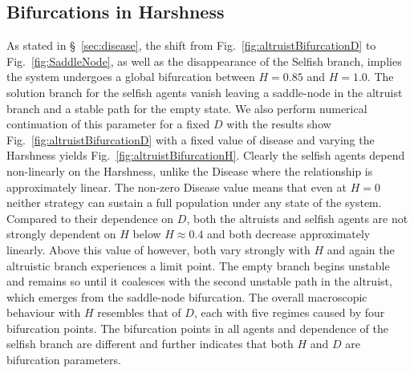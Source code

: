 \documentclass[11pt]{article}
\begin{document}
 

\subsection{Bifurcations in Harshness}
\label{sec:harshness}



As stated in \S~\ref{sec:disease}, the shift from Fig.~\ref{fig:altruistBifurcationD} to Fig.~\ref{fig:SaddleNode}, as well as the disappearance of the Selfish branch, implies the system undergoes a global bifurcation between $H=0.85$ and $H=1.0$. The solution branch for the selfish agents vanish leaving a saddle-node in the altruist branch and a stable path for the empty state. We also perform numerical continuation of this parameter for a fixed $D$ with the results show Fig.~\ref{fig:altruistBifurcationD} with a fixed value of disease and varying the Harshness yields Fig.~\ref{fig:altruistBifurcationH}. Clearly the selfish agents depend non-linearly on the Harshness, unlike the Disease where the relationship is approximately linear. The non-zero Disease value means that even at $H=0$ neither strategy can sustain a full population under any state of the system. Compared to their dependence on $D$, both the altruists and selfish agents are not strongly dependent on $H$ below $H\approx0.4$ and both decrease approximately linearly. Above this value of however, both vary strongly with $H$ and again the altruistic branch experiences a limit point. The empty branch begins unstable and remains so until it coalesces with the second unstable path in the altruist, which emerges from the saddle-node bifurcation. The overall macroscopic behaviour with $H$ resembles that of $D$, each with five regimes caused by four bifurcation points. The bifurcation points in all agents and dependence of the selfish branch are different and further indicates that both $H$ and $D$ are bifurcation parameters. 
 
\end{document}
